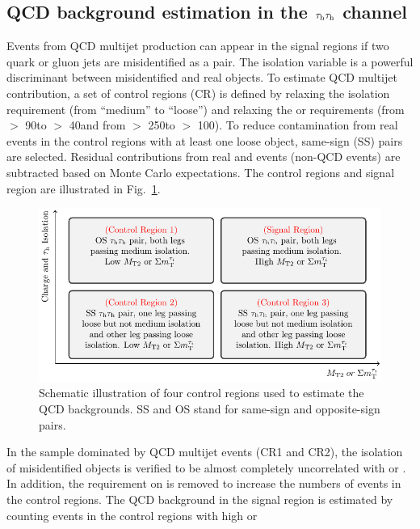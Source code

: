\subsection{\texorpdfstring{QCD background estimation in the $\tau_{\rm h}\tau_{\rm h}$ channel}{QCD background estimation in the tau-tau channel}}
\label{sect:bkgQCD}
Events from QCD multijet production can appear in the signal regions 
if two quark or gluon jets are misidentified as a \tauTau pair.
The isolation variable is a powerful 
discriminant between misidentified and real \Tau objects. To estimate QCD multijet contribution, a set of \tauTau control regions (CR) is defined 
by relaxing the \Tau isolation requirement (from ``medium'' to ``loose'') 
and relaxing the \mttwo or \SumMT requirements (from \mttwo $>$ 90\GeV to \mttwo $>$ 40\GeV and from \SumMT $>$ 250\GeV to \SumMT $>$ 100\GeV). 
To reduce contamination from real \tauTau events 
in the control regions with at least one loose \Tau object, 
same-sign (SS) \tauTau pairs are selected. Residual contributions from real 
\tauTau and \wjets events (non-QCD events) are subtracted based on Monte Carlo expectations. 
The control regions and signal region are 
illustrated in Fig.~\ref{fig:ABCDQCD}. 
\begin{figure}[!htb]
\centering
\includegraphics[angle=0,scale=1.15]{Bkg/ABCD.pdf}
\caption{Schematic illustration of four control regions used to estimate the QCD backgrounds. SS and OS stand for same-sign and opposite-sign pairs.}
\label{fig:ABCDQCD}
\end{figure}
In the sample dominated by QCD multijet events (CR1 and CR2), the isolation of misidentified \Tau objects is verified 
to be almost completely uncorrelated with \mttwo or \SumMT.
In addition, the requirement on \deltaphi
is removed to increase the numbers of events in the control regions. 
The QCD background in the signal region is estimated by counting events in the control regions with high \mttwo or \SumMT  
